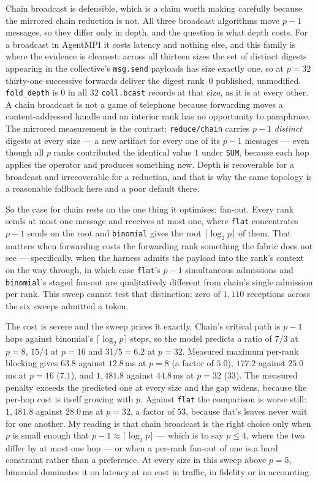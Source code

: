 \documentclass[11pt]{article}
\begin{document}
Chain broadcast is defensible, which is a claim worth making carefully because the mirrored
chain reduction is not. All three broadcast algorithms move $p-1$ messages, so they differ
only in depth, and the question is what depth costs. For a broadcast in AgentMPI it costs
latency and nothing else, and this family is where the evidence is cleanest: across all
thirteen sizes the set of distinct digests appearing in the collective's \texttt{msg.send}
payloads has size exactly one, so at $p=32$ thirty-one successive forwards deliver the
digest rank~0 published, unmodified. \texttt{fold\_depth} is $0$ in all $32$
\texttt{coll.bcast} records at that size, as it is at every other. A chain broadcast is not a
game of telephone because forwarding moves a content-addressed handle and an interior rank has
no opportunity to paraphrase. The mirrored measurement is the contrast: \texttt{reduce/chain}
carries $p-1$ \emph{distinct} digests at every size --- a new artifact for every one of its
$p-1$ messages --- even though all $p$ ranks contributed the identical value $1$ under
\texttt{SUM}, because each hop applies the operator and produces something new. Depth is
recoverable for a broadcast and irrecoverable for a reduction, and that is why the same
topology is a reasonable fallback here and a poor default there.

So the case for chain rests on the one thing it optimises: fan-out. Every rank sends at most
one message and receives at most one, where \texttt{flat} concentrates $p-1$ sends on the root
and \texttt{binomial} gives the root $\lceil\log_2 p\rceil$ of them. That matters when
forwarding costs the forwarding rank something the fabric does not see --- specifically, when
the harness admits the payload into the rank's context on the way through, in which case
\texttt{flat}'s $p-1$ simultaneous admissions and \texttt{binomial}'s staged fan-out are
qualitatively different from chain's single admission per rank. This sweep cannot test that
distinction: zero of $1{,}110$ receptions across the six sweeps admitted a token.

The cost is severe and the sweep prices it exactly. Chain's critical path is $p-1$ hops
against binomial's $\lceil\log_2 p\rceil$ steps, so the model predicts a ratio of $7/3$ at
$p=8$, $15/4$ at $p=16$ and $31/5=6.2$ at $p=32$. Measured maximum per-rank blocking gives
$63.8$ against $12.8$\,ms at $p=8$ (a factor of $5.0$), $177.2$ against $25.0$\,ms at $p=16$
($7.1$), and $1{,}481.8$ against $44.8$\,ms at $p=32$ ($33$). The measured penalty exceeds the
predicted one at every size and the gap widens, because the per-hop cost is itself growing
with $p$. Against \texttt{flat} the comparison is worse still: $1{,}481.8$ against $28.0$\,ms
at $p=32$, a factor of $53$, because flat's leaves never wait for one another. My reading is
that chain broadcast is the right choice only when $p$ is small enough that $p-1 \approx
\lceil\log_2 p\rceil$ --- which is to say $p \le 4$, where the two differ by at most one hop
--- or when a per-rank fan-out of one is a hard constraint rather than a preference. At every
size in this sweep above $p=5$, binomial dominates it on latency at no cost in traffic, in
fidelity or in accounting.
\end{document}
